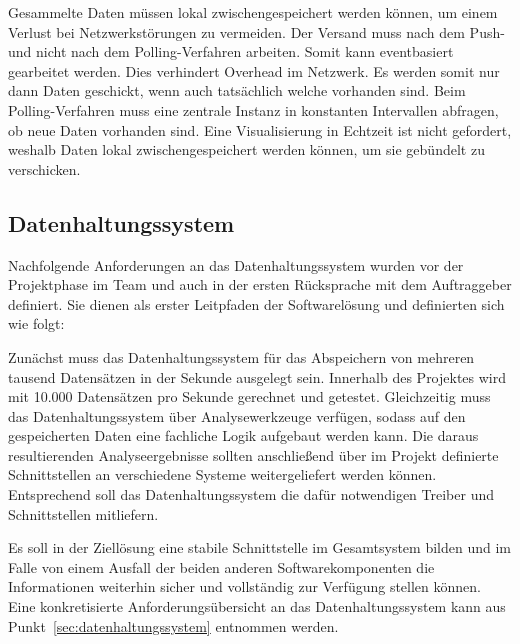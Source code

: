 Gesammelte Daten müssen lokal zwischengespeichert werden können, um einem
Verlust bei Netzwerkstörungen zu vermeiden. Der Versand muss nach dem Push- und
nicht nach dem Polling-Verfahren arbeiten. Somit kann eventbasiert gearbeitet
werden. Dies verhindert Overhead im Netzwerk. Es werden somit nur dann Daten
geschickt, wenn auch tatsächlich welche vorhanden sind. Beim Polling-Verfahren
muss eine zentrale Instanz in konstanten Intervallen abfragen, ob neue Daten
vorhanden sind. Eine Visualisierung in Echtzeit ist nicht gefordert, weshalb
Daten lokal zwischengespeichert werden können, um sie gebündelt zu verschicken.
\tm%

\subsection{Datenhaltungssystem}
Nachfolgende Anforderungen an das Datenhaltungssystem wurden vor der
Projektphase im Team und auch in der ersten Rücksprache mit dem Auftraggeber
definiert. Sie dienen als erster Leitpfaden der Softwarelösung und definierten
sich wie folgt:

\begin{outline}
  \1 Zunächst muss das Datenhaltungssystem für das Abspeichern von mehreren
  tausend Datensätzen in der Sekunde ausgelegt sein. Innerhalb des Projektes
  wird mit 10.000 Datensätzen pro Sekunde gerechnet und getestet.
  \1 Gleichzeitig muss das Datenhaltungssystem über Analysewerkzeuge verfügen,
  sodass auf den gespeicherten Daten eine fachliche Logik aufgebaut werden
  kann.
  \1 Die daraus resultierenden Analyseergebnisse sollten anschließend über im
  Projekt definierte Schnittstellen an verschiedene Systeme weitergeliefert
  werden können. Entsprechend soll das Datenhaltungssystem die dafür
  notwendigen Treiber und Schnittstellen mitliefern.
\end{outline}

Es soll in der Ziellösung eine stabile Schnittstelle im Gesamtsystem bilden
und im Falle von einem Ausfall der beiden anderen Softwarekomponenten die
Informationen weiterhin sicher und vollständig zur Verfügung stellen können.
Eine konkretisierte Anforderungsübersicht an das Datenhaltungssystem kann aus
Punkt~\ref{sec:datenhaltungssystem} entnommen werden.
\nl%

